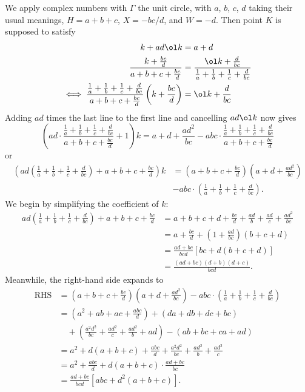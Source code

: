 \documentclass[11pt]{scrartcl}
\begin{document}
We apply complex numbers with $\Gamma$ the unit circle,
with $a$, $b$, $c$, $d$ taking their usual meanings,
$H = a+b+c$, $X = -bc/d$, and $W = -d$.
Then point $K$ is supposed to satisfy
\begin{align*}
  k + ad \ol k &= a+d \\
  \frac{k+\frac{bc}{d}}{a+b+c+\frac{bc}{d}}
    &= \frac{\ol k + \frac{d}{bc}}{\frac1a+\frac1b+\frac1c+\frac{d}{bc}} \\
  \iff \frac{\frac1a+\frac1b+\frac1c+\frac{d}{bc}}{a+b+c+\frac{bc}{d}}
    \left( k + \frac{bc}{d} \right)
  &= \ol k + \frac{d}{bc}
\end{align*}
Adding $ad$ times the last line to the first line and cancelling $ad \ol k$ now gives
\[
  \left( ad \cdot \frac{\frac1a+\frac1b+\frac1c+\frac{d}{bc}}%
    {a+b+c+\frac{bc}{d}} + 1 \right) k
  = a + d + \frac{ad^2}{bc} - abc \cdot
  \frac{\frac1a+\frac1b+\frac1c+\frac{d}{bc}}{a+b+c+\frac{bc}{d}}
\]
or
\begin{align*}
  \left( ad \left( \frac1a+\frac1b+\frac1c+\frac{d}{bc} \right)
    + a+b+c+\frac{bc}{d} \right) k
  &= \left( a+b+c+\frac{bc}{d}  \right)
  \left( a + d + \frac{ad^2}{bc} \right) \\
  &- abc \cdot \left( \frac1a+\frac1b+\frac1c+\frac{d}{bc} \right).
\end{align*}
We begin by simplifying the coefficient of $k$:
\begin{align*}
  ad \left( \frac1a+\frac1b+\frac1c+\frac{d}{bc} \right)
    + a+b+c+\frac{bc}{d}
  &= a+b+c+d + \frac{bc}{d}+\frac{ad}{b}+\frac{ad}{c} + \frac{ad^2}{bc} \\
  &= a + \frac{bc}{d} + \left( 1 + \frac{ad}{bc} \right)(b+c+d) \\
  &= \frac{ad+bc}{bcd} \left[ bc + d(b+c+d) \right] \\
  &= \frac{(ad+bc)(d+b)(d+c)}{bcd}.
\end{align*}
Meanwhile, the right-hand side expands to
\begin{align*}
  \text{RHS} &=
  \left( a+b+c+\frac{bc}{d}  \right)
  \left( a + d + \frac{ad^2}{bc} \right)
  - abc \cdot \left( \frac1a+\frac1b+\frac1c+\frac{d}{bc} \right) \\
  &= \left( a^2+ab+ac+\frac{abc}{d} \right)
  + \left( da+db+dc+bc \right) \\
  &\quad+ \left( \frac{a^2d^2}{bc} + \frac{ad^2}{c} + \frac{ad^2}{b} + ad \right)
  - \left( ab+bc+ca+ad \right) \\
  &= a^2 + d(a+b+c) + \frac{abc}{d} + \frac{a^2d^2}{bc}
  + \frac{ad^2}{b} + \frac{ad^2}{c} \\
  &= a^2 + \frac{abc}{d} + d(a+b+c) \cdot \frac{ad+bc}{bc} \\
  &= \frac{ad+bc}{bcd} \left[ abc+d^2(a+b+c) \right].
\end{align*}
\end{document}
